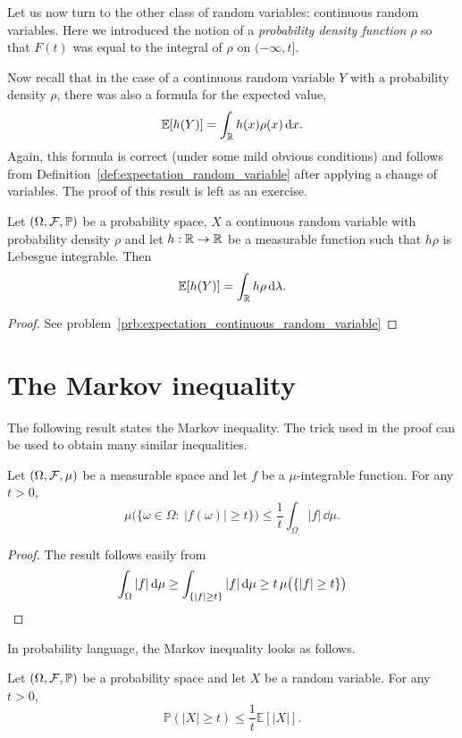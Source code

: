 Let us now turn to the other class of random variables: continuous random variables. Here we introduced the notion of a \emph{probability density function} $\rho$ so that $F(t)$ was equal to the integral of $\rho$ on $(-\infty,t]$. 

Now recall that in the case of a continuous random variable $Y$ with a probability density $\rho$, there was also a formula for the expected value,
\[
	\mathbb E[h(Y)] = \int_{\mathbb R} h(x) \rho(x) \, \mathrm{d} x.
\]
Again, this formula is correct (under some mild obvious conditions) and follows from Definition~\ref{def:expectation_random_variable} after applying a change of variables. The proof of this result is left as an exercise.

\begin{lemma}\label{lem:expectation_continuous_random_variable}
Let $(\Omega, \mathcal F, \mathbb{P})$ be a probability space, $X$ a continuous random variable with probability density $\rho$ and let $h : \mathbb R \to \mathbb R$ be a measurable function such that $h \rho$ is Lebesgue integrable. Then
\[
	\mathbb E[h(Y)] = \int_{\mathbb R} h \rho \, \mathrm{d} \lambda.
\]
\end{lemma}

\begin{proof}
See problem~\ref{prb:expectation_continuous_random_variable}
\end{proof}

\section{The Markov inequality}

The following result states the Markov inequality. The trick used in the proof can be used to obtain many similar inequalities.

\begin{lemma}
	Let $(\Omega, \mathcal F, \mu)$ be a measurable space and let $f$ be a $\mu$-integrable function. For any $t>0$,
	\[
	\mu\bigl(\{ \omega \in \Omega : \ |f(\omega)| \geq t \}\bigr) \leq \frac{1}{t} \int_\Omega |f| \,\dd \mu.
	\]
\end{lemma}
\begin{proof} The result follows easily from
	\[
		\int_\Omega |f|\,\mathrm{d} \mu \ge \int_{\{|f|\ge t\}} |f|\,\mathrm{d} \mu \ge t\,\mu\bigl(\{|f|\ge t\}\bigr)  \qedhere
	\]
\end{proof}


In probability language, the Markov inequality looks as follows.

\begin{lemma}
	Let $(\Omega, \mathcal F, \mathbb{P})$ be a probability space and let $X$ be a random variable. For any $t>0$,
	\[
	\mathbb{P}(|X| \geq t) \leq \frac{1}{t} \mathbb{E}[|X|].
	\]
\end{lemma}

